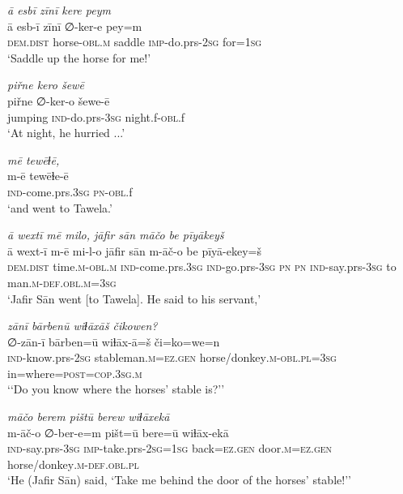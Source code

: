 \ea \label{ŠJ.53}
\textit{ā esbī zīnī kere peym} \\ 
\gll ā esb-ī zīnī ∅-ker-e pey=m \\ 
 \textsc{dem.dist} horse\textsc{-obl}\textsc{.m} saddle \textsc{imp-}do.prs-\textsc{2sg} for\textsc{=\textsc{1sg}} \\ 
\glt `Saddle up the horse for me!'
\z 
 
\ea \label{ŠJ.55}
\textit{piřne kero šewē} \\ 
\gll piřne ∅-ker-o šewe-ē \\ 
 jumping \textsc{ind-}do.prs\textsc{-3sg} night.f\textsc{-obl}.f \\ 
\glt `At night, he hurried ...'
\z 
 
\ea \label{ŠJ.56}
\textit{mē tewēɫē,} \\ 
\gll m-ē tewēɫe-ē \\ 
 \textsc{ind-}come.prs\textsc{.3sg} \textsc{pn}\textsc{-obl}.f \\ 
\glt `and went to Tawela.'
\z 
 
\ea \label{ŠJ.59}
\textit{ā wextī mē milo, jāfir sān māčo be pīyākeyš} \\ 
\gll ā wext-ī m-ē mi-l-o jāfir sān m-āč-o be pīyā-ekey=š \\ 
 \textsc{dem.dist} time\textsc{.m}\textsc{-obl}\textsc{.m} \textsc{ind-}come.prs\textsc{.3sg} \textsc{ind-}go.prs\textsc{-3sg} \textsc{pn} \textsc{pn} \textsc{ind-}say.prs\textsc{-3sg} to man\textsc{.m}\textsc{-def}\textsc{.obl}\textsc{.m}\textsc{=3sg} \\ 
\glt `Jafir Sān went [to Tawela]. He said to his servant,'
\z 
 
\ea \label{ŠJ.60}
\textit{zānī bārbenū wiɫāxāš čikowen?} \\ 
\gll ∅-zān-ī bārben=ū wiɫāx-ā=š či=ko=we=n \\ 
 \textsc{ind-}know.prs-\textsc{2sg} stableman\textsc{.m}\textsc{=ez.gen} horse/donkey\textsc{.m}\textsc{-obl}\textsc{.pl}\textsc{=3sg} in=where\textsc{=\textsc{post}}\textsc{=cop}\textsc{.3sg}\textsc{.m} \\ 
\glt `‘Do you know where the horses’ stable is?’'
\z 
 
\ea \label{ŠJ.62}
\textit{māčo berem pištū berew wiɫāxekā} \\ 
\gll m-āč-o ∅-ber-e=m pišt=ū bere=ū wiɫāx-ekā \\ 
 \textsc{ind-}say.prs\textsc{-3sg} \textsc{imp-}take.prs-\textsc{2sg}\textsc{=\textsc{1sg}} back\textsc{=ez.gen} door\textsc{.m}\textsc{=ez.gen} horse/donkey\textsc{.m}\textsc{-def}\textsc{.obl}\textsc{.pl} \\ 
\glt `He (Jafir Sān) said, ‘Take me behind the door of the horses’ stable!’'
\z 
 
